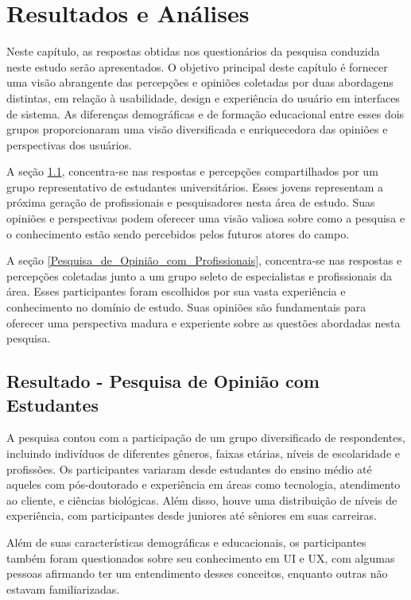 \chapter[Resultados]{Resultados e Análises}


Neste capítulo, as respostas obtidas nos questionários da pesquisa conduzida neste estudo serão apresentados. O objetivo principal deste capítulo é fornecer uma visão abrangente das percepções e opiniões coletadas por duas abordagens distintas, em relação à usabilidade, design e experiência do usuário em interfaces de sistema. As diferenças demográficas e de formação educacional entre esses dois grupos proporcionaram uma visão diversificada e enriquecedora das opiniões e perspectivas dos usuários.

A seção \ref{Pesquisa_de_Opinião_com_Estudantes}, concentra-se nas respostas e percepções compartilhados por um grupo representativo de estudantes universitários. Esses jovens representam a próxima geração de profissionais e pesquisadores nesta área de estudo. Suas opiniões e perspectivas podem oferecer uma visão valiosa sobre como a pesquisa e o conhecimento estão sendo percebidos pelos futuros atores do campo.

A seção \ref{Pesquisa_de_Opinião_com_Profissionais}, concentra-se nas respostas e percepções coletadas junto a um grupo seleto de especialistas e profissionais da área. Esses participantes foram escolhidos por sua vasta experiência e conhecimento no domínio de estudo. Suas opiniões são fundamentais para oferecer uma perspectiva madura e experiente sobre as questões abordadas nesta pesquisa.

\section{Resultado - Pesquisa de Opinião com Estudantes}
\label{Pesquisa_de_Opinião_com_Estudantes}
A pesquisa contou com a participação de um grupo diversificado de respondentes, incluindo indivíduos de diferentes gêneros, faixas etárias, níveis de escolaridade e profissões. Os participantes variaram desde estudantes do ensino médio até aqueles com pós-doutorado e experiência em áreas como tecnologia, atendimento ao cliente, e ciências biológicas. Além disso, houve uma distribuição de níveis de experiência, com participantes desde juniores até sêniores em suas carreiras.

Além de suas características demográficas e educacionais, os participantes também foram questionados sobre seu conhecimento em \ac{UI} e \ac{UX}, com algumas pessoas afirmando ter um entendimento desses conceitos, enquanto outras não estavam familiarizadas.

